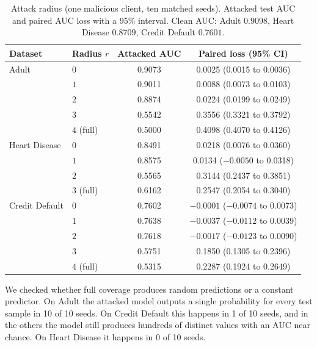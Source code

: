 \documentclass[11pt]{article}
\newcommand{\rev}[1]{{\color{blue}#1}}
\newcommand{\revfloat}[1]{{\color{blue}#1}}
\begin{document}
\begin{table}[htbp]
\centering
\revfloat{\caption{Attack radius (one malicious client, ten matched seeds). Attacked test AUC and paired AUC loss with a 95\% interval. Clean AUC: Adult $0.9098$, Heart Disease $0.8709$, Credit Default $0.7601$.}\label{tab:radius}}
\begin{tabular}{llcc}
\toprule
\rev{Dataset} & \rev{Radius $r$} & \rev{Attacked AUC} & \rev{Paired loss (95\% CI)} \\
\midrule
\rev{Adult} & \rev{$0$} & \rev{0.9073} & \rev{0.0025 (0.0015 to 0.0036)} \\
\rev{} & \rev{$1$} & \rev{0.9011} & \rev{0.0088 (0.0073 to 0.0103)} \\
\rev{} & \rev{$2$} & \rev{0.8874} & \rev{0.0224 (0.0199 to 0.0249)} \\
\rev{} & \rev{$3$} & \rev{0.5542} & \rev{0.3556 (0.3321 to 0.3792)} \\
\rev{} & \rev{$4$ (full)} & \rev{0.5000} & \rev{0.4098 (0.4070 to 0.4126)} \\
\midrule
\rev{Heart Disease} & \rev{$0$} & \rev{0.8491} & \rev{0.0218 (0.0076 to 0.0360)} \\
\rev{} & \rev{$1$} & \rev{0.8575} & \rev{0.0134 ($-0.0050$ to 0.0318)} \\
\rev{} & \rev{$2$} & \rev{0.5565} & \rev{0.3144 (0.2437 to 0.3851)} \\
\rev{} & \rev{$3$ (full)} & \rev{0.6162} & \rev{0.2547 (0.2054 to 0.3040)} \\
\midrule
\rev{Credit Default} & \rev{$0$} & \rev{0.7602} & \rev{$-0.0001$ ($-0.0074$ to 0.0073)} \\
\rev{} & \rev{$1$} & \rev{0.7638} & \rev{$-0.0037$ ($-0.0112$ to 0.0039)} \\
\rev{} & \rev{$2$} & \rev{0.7618} & \rev{$-0.0017$ ($-0.0123$ to 0.0090)} \\
\rev{} & \rev{$3$} & \rev{0.5751} & \rev{0.1850 (0.1305 to 0.2396)} \\
\rev{} & \rev{$4$ (full)} & \rev{0.5315} & \rev{0.2287 (0.1924 to 0.2649)} \\
\bottomrule
\end{tabular}
\end{table}

\rev{We checked whether full coverage produces random predictions or a constant predictor. On Adult the attacked model outputs a single probability for every test sample in 10 of 10 seeds. On Credit Default this happens in 1 of 10 seeds, and in the others the model still produces hundreds of distinct values with an AUC near chance. On Heart Disease it happens in 0 of 10 seeds.}
\end{document}
